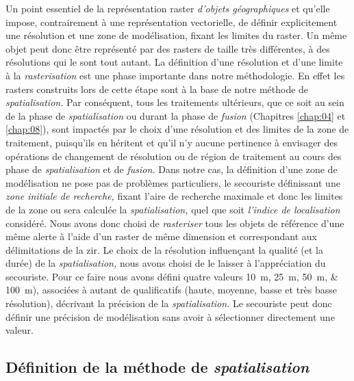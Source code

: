 Un point essentiel de la représentation raster \emph{d'objets
  géographiques} et qu'elle impose, contrairement à une représentation
vectorielle, de définir explicitement une résolution et une zone de
modélisation, fixant les limites du raster. Un même objet peut donc
être représenté par des rasters de taille très différentes, à des
résolutions qui le sont tout autant. La définition d'une résolution et
d'une limite à la \emph{rasterisation} est une phase importante dans
notre méthodologie. En effet les rasters construits lors de cette
étape sont à la base de notre méthode de \emph{spatialisation.} Par
conséquent, tous les traitements ultérieurs, que ce soit au sein de la
phase de \emph{spatialisation} ou durant la phase de \emph{fusion}
(Chapitres \ref{chap:04} et \ref{chap:08}), sont impactés par le choix
d'une résolution et des limites de la zone de traitement, puisqu'ils
en héritent et qu'il n'y aucune pertinence à envisager des opérations
de changement de résolution ou de région de traitement au cours des
phase de \emph{spatialisation} et de \emph{fusion.} Dans notre cas, la
définition d'une zone de modélisation ne pose pas de problèmes
particuliers, le secouriste définissant une \emph{zone initiale de
  recherche,} fixant l'aire de recherche maximale et donc les limites
de la zone ou sera calculée la \emph{spatialisation,} quel que soit
\emph{l'indice de localisation} considéré. Nous avons donc choisi de
\emph{rasteriser} tous les objets de référence d'une même alerte à
l'aide d'un raster de même dimension et correspondant aux
délimitations de la \ac{zir}. Le choix de la résolution influençant la
qualité (et la durée) de la \emph{spatialisation,} nous avons choisi
de le laisser à l'appréciation du secouriste. Pour ce faire nous avons
défini quatre valeurs \SIlist{10;25;50;100}{\meter}), associées à
autant de qualificatifs (haute, moyenne, basse et très basse
résolution), décrivant la précision de la \emph{spatialisation.} Le
secouriste peut donc définir une précision de modélisation sans avoir
à sélectionner directement une valeur.

\subsection{Définition de la méthode de \emph{spatialisation}}

